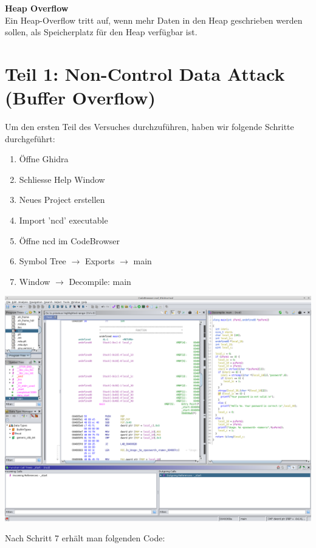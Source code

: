 \documentclass[12pt,a4paper]{article}
\begin{document}
	\textbf{Heap Overflow}\\
	Ein Heap-Overflow tritt auf, wenn mehr Daten in den Heap geschrieben werden sollen, als Speicherplatz für 
	den Heap verfügbar ist.
	\bigskip
	
	\section*{Teil 1: Non-Control Data Attack (Buffer Overflow)}
	
	Um den ersten Teil des Versuches durchzuführen, haben wir folgende Schritte durchgeführt:
	
	\begin{enumerate}
		\item Öffne Ghidra
		\item Schliesse Help Window
		\item Neues Project erstellen
		\item Import 'ncd' executable
		\item Öffne ncd im CodeBrowser
		\item Symbol Tree $\rightarrow$ Exports $\rightarrow$ main
		\item Window $\rightarrow$ Decompile: main 
	\end{enumerate}
	
	\begin{center}
		\includegraphics[scale=0.3]{ghidra.png}
	\end{center}
	
	Nach Schritt 7 erhält man folgenden Code:\\
	
\end{document}
